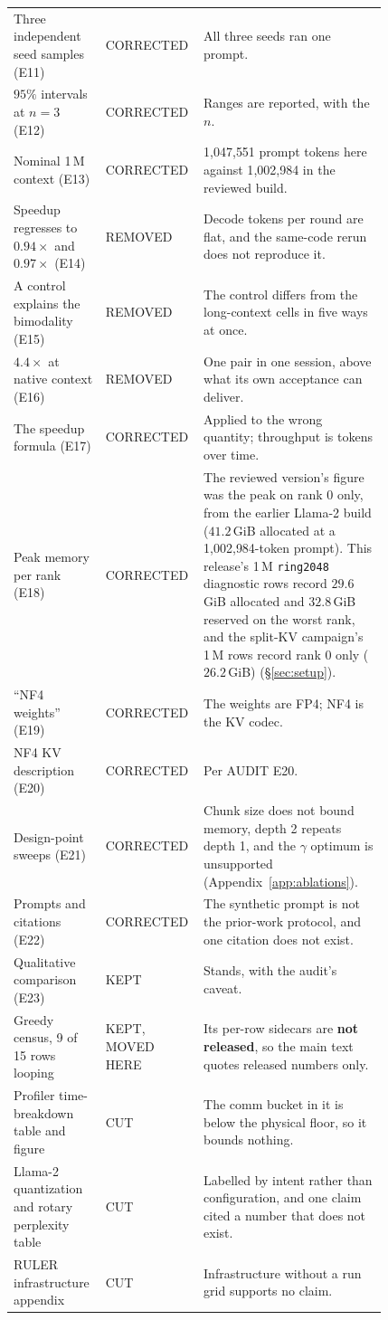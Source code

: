 \documentclass{article}
\begin{document}
\begin{table}[h]
\begin{tabular}{p{0.20\linewidth} p{0.155\linewidth} p{0.47\linewidth}}
Three independent seed samples (E11) & CORRECTED & All three seeds ran one prompt. \\
$95\%$ intervals at $n{=}3$ (E12) & CORRECTED & Ranges are reported, with the $n$. \\
Nominal 1\,M context (E13) & CORRECTED & 1{,}047{,}551 prompt tokens here against 1{,}002{,}984 in the reviewed build. \\
Speedup regresses to $0.94\times$ and $0.97\times$ (E14) & REMOVED & Decode tokens per round are flat, and the same-code rerun does not reproduce it. \\
A control explains the bimodality (E15) & REMOVED & The control differs from the long-context cells in five ways at once. \\
$4.4\times$ at native context (E16) & REMOVED & One pair in one session, above what its own acceptance can deliver. \\
The speedup formula (E17) & CORRECTED & Applied to the wrong quantity; throughput is tokens over time. \\
Peak memory per rank (E18) & CORRECTED & The reviewed version's figure was the peak on rank 0 only, from the earlier Llama-2 build ($41.2$\,GiB allocated at a 1{,}002{,}984-token prompt). This release's 1\,M \texttt{ring2048} diagnostic rows record $29.6$\,GiB allocated and $32.8$\,GiB reserved on the worst rank, and the split-KV campaign's 1\,M rows record rank 0 only ($26.2$\,GiB) (\S\ref{sec:setup}). \\
``NF4 weights'' (E19) & CORRECTED & The weights are FP4; NF4 is the KV codec. \\
NF4 KV description (E20) & CORRECTED & Per AUDIT E20. \\
Design-point sweeps (E21) & CORRECTED & Chunk size does not bound memory, depth 2 repeats depth 1, and the $\gamma$ optimum is unsupported (Appendix~\ref{app:ablations}). \\
Prompts and citations (E22) & CORRECTED & The synthetic prompt is not the prior-work protocol, and one citation does not exist. \\
Qualitative comparison (E23) & KEPT & Stands, with the audit's caveat. \\
Greedy census, 9 of 15 rows looping & KEPT, MOVED HERE & Its per-row sidecars are \textbf{not released}, so the main text quotes released numbers only. \\
Profiler time-breakdown table and figure & CUT & The comm bucket in it is below the physical floor, so it bounds nothing. \\
Llama-2 quantization and rotary perplexity table & CUT & Labelled by intent rather than configuration, and one claim cited a number that does not exist. \\
RULER infrastructure appendix & CUT & Infrastructure without a run grid supports no claim. \\
\bottomrule
\end{tabular}
\end{table}
\end{document}
